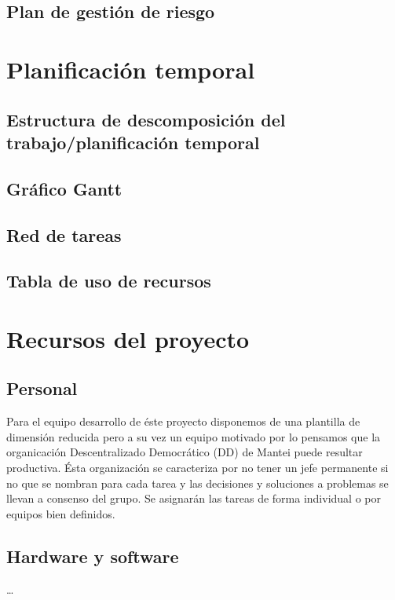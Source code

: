 \documentclass[11pt, a4paper, twoside]{report}
\begin{document}
		\subsection{Plan de gestión de riesgo}
	\section{Planificación temporal}		
		\subsection{Estructura de descomposición del trabajo/planificación temporal}
		\subsection{Gráfico Gantt}
		\subsection{Red de tareas}
		\subsection{Tabla de uso de recursos}
	\section{Recursos del proyecto}
		\subsection{Personal}
		Para el equipo desarrollo de éste proyecto disponemos de una plantilla de dimensión reducida pero a su vez un equipo motivado por lo pensamos que la organicación Descentralizado Democrático (DD) de Mantei puede resultar productiva. Ésta organización se caracteriza por no tener un jefe permanente si no que se nombran para cada tarea y las decisiones y soluciones a problemas se llevan a consenso del grupo. Se asignarán las tareas de forma individual o por equipos bien definidos.

		\subsection{Hardware y software}
			\ldots
\end{document}

